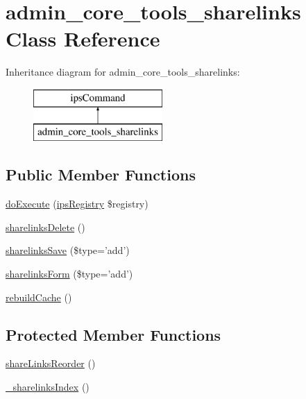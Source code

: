 \hypertarget{classadmin__core__tools__sharelinks}{\section{admin\-\_\-core\-\_\-tools\-\_\-sharelinks Class Reference}
\label{classadmin__core__tools__sharelinks}
}
Inheritance diagram for admin\-\_\-core\-\_\-tools\-\_\-sharelinks\-:\begin{figure}[H]
\begin{center}
\leavevmode
\includegraphics[height=2.000000cm]{classadmin__core__tools__sharelinks}
\end{center}
\end{figure}
\subsection*{Public Member Functions}
\begin{DoxyCompactItemize}
\item 
\hyperlink{classadmin__core__tools__sharelinks_afbc4e912a0604b94d47d66744c64d8ba}{do\-Execute} (\hyperlink{classips_registry}{ips\-Registry} \$registry)
\item 
\hyperlink{classadmin__core__tools__sharelinks_a4a03e06fe459c470d873b37113b105fe}{sharelinks\-Delete} ()
\item 
\hyperlink{classadmin__core__tools__sharelinks_aa152df3c80da946295c7bf5c49c3ddf3}{sharelinks\-Save} (\$type='add')
\item 
\hyperlink{classadmin__core__tools__sharelinks_af6ca92886153bfd50c5143dfc6c42628}{sharelinks\-Form} (\$type='add')
\item 
\hyperlink{classadmin__core__tools__sharelinks_acca9b08c34cf38662a27c568d5a380f0}{rebuild\-Cache} ()
\end{DoxyCompactItemize}
\subsection*{Protected Member Functions}
\begin{DoxyCompactItemize}
\item 
\hyperlink{classadmin__core__tools__sharelinks_a7f6a025dc1f67678308c62f4ddcb55ab}{share\-Links\-Reorder} ()
\item 
\hyperlink{classadmin__core__tools__sharelinks_a0c0a3cb0d8bf795b7ccb3cb25c3d12a1}{\-\_\-sharelinks\-Index} ()
\end{DoxyCompactItemize}
